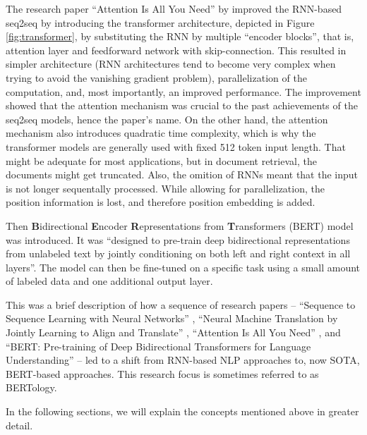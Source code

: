 The research paper ``Attention Is All You Need'' by \citet{attention-is-all-you-need} improved the RNN-based seq2seq by introducing the transformer architecture, depicted in Figure \ref{fig:transformer}, by substituting the RNN by multiple ``encoder blocks'', that is, attention layer and feedforward network with skip-connection. 
This resulted in simpler architecture (RNN architectures tend to become very complex when trying to avoid the vanishing gradient problem), parallelization of the computation, and, most importantly, an improved performance. 
The improvement showed that the attention mechanism was crucial to the past achievements of the seq2seq models, hence the paper's name.
On the other hand, the attention mechanism also introduces quadratic time complexity, which is why the transformer models are generally used with fixed 512 token input length.
That might be adequate for most applications, but in document retrieval, the documents might get truncated.
Also, the omition of RNNs meant that the input is not longer sequentally processed. 
While allowing for parallelization, the position information is lost, and therefore position embedding is added. 

Then \textbf{B}idirectional \textbf{E}ncoder \textbf{R}epresentations from \textbf{T}ransformers (BERT) \citep{bert} model was introduced. It was ``designed to pre-train deep bidirectional representations from unlabeled text by jointly conditioning on both left and right context in all layers''. 
The model can then be fine-tuned on a specific task using a small amount of labeled data and one additional output layer. 

This was a brief description of how a sequence of research papers -- ``Sequence to Sequence Learning with Neural Networks'' \citep{seq2seq}, ``Neural Machine Translation by Jointly Learning to Align and Translate'' \citep{first-attention}, ``Attention Is All You Need'' \citep{attention-is-all-you-need}, and ``BERT: Pre-training of Deep Bidirectional Transformers for Language Understanding'' \citep{bert} -- led to a shift from RNN-based NLP approaches to, now SOTA, BERT-based approaches.
This research focus is sometimes referred to as BERTology.

In the following sections, we will explain the concepts mentioned above in greater detail.


